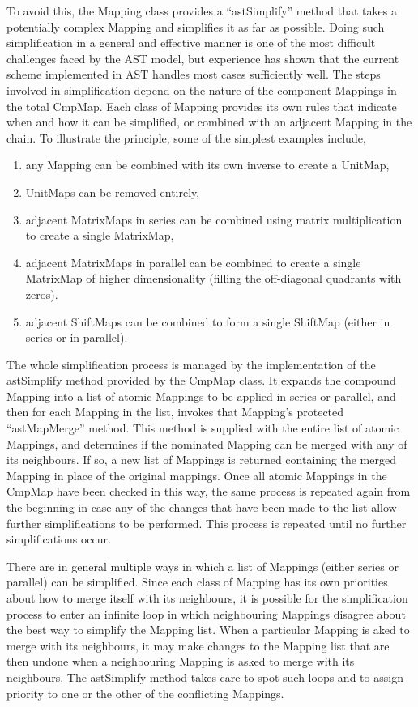\documentclass[final,authoryear,5p,times,twocolumn]{elsarticle}
\begin{document}
To avoid this, the Mapping class provides a ``astSimplify'' method that
takes a potentially complex Mapping and simplifies it as far as possible.
Doing such simplification in a general and effective manner is one of the
most difficult challenges faced by the AST model, but experience has shown
that the current scheme implemented in AST handles most cases sufficiently
well. The steps involved in simplification depend on the nature of the
component Mappings in the total CmpMap. Each class of Mapping provides its
own rules that indicate when and how it can be simplified, or combined
with an adjacent Mapping in the chain. To illustrate the principle,
some of the simplest examples include,

\begin{enumerate}
\item any Mapping can be combined with its own inverse to create a UnitMap,
\item UnitMaps can be removed entirely,
\item adjacent MatrixMaps in series can be combined using matrix
multiplication to create a single MatrixMap,
\item adjacent MatrixMaps in parallel can be combined to create a
single MatrixMap of higher dimensionality (filling the off-diagonal
quadrants with zeros).
\item adjacent ShiftMaps can be combined to form a single ShiftMap
(either in series or in parallel).
\end{enumerate}

The whole simplification process is managed by the implementation of the
astSimplify method provided by the CmpMap class. It expands the compound
Mapping into a list of atomic Mappings to be applied in series or
parallel, and then for each Mapping in the list, invokes that Mapping’s
protected ``astMapMerge'' method. This method is supplied with the entire
list of atomic Mappings, and determines if the nominated Mapping can be
merged with any of its neighbours. If so, a new list of Mappings is
returned containing the merged Mapping in place of the original mappings.
Once all atomic Mappings in the CmpMap have been checked in this way, the
same process is repeated again from the beginning in case any of the
changes that have been made to the list allow further simplifications to
be performed. This process is repeated until no further simplifications
occur.

There are in general multiple ways in which a list of Mappings (either
series or parallel) can be simplified. Since each class of Mapping has
its own priorities about how to merge itself with its neighbours, it is
possible for the simplification process to enter an infinite loop in
which neighbouring Mappings disagree about the best way to simplify the
Mapping list. When a particular Mapping is aked to merge with its
neighbours, it may make changes to the Mapping list that are then undone
when a neighbouring Mapping is asked to merge with its neighbours. The
astSimplify method takes care to spot such loops and to assign priority
to one or the other of the conflicting Mappings.
\end{document}
